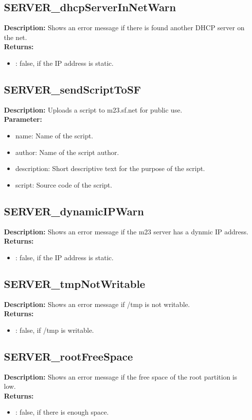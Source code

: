 \subsection{SERVER\_dhcpServerInNetWarn}
\textbf{Description:} Shows an error message if there is found another DHCP server on the net.\\
\textbf{Returns:}
\begin{itemize}
\item : false, if the IP address is static.
\end{itemize}

\subsection{SERVER\_sendScriptToSF}
\textbf{Description:} Uploads a script to m23.sf.net for public use.\\
\textbf{Parameter:}
\begin{itemize}
\item name: Name of the script.
\item author: Name of the script author.
\item description: Short descriptive text for the purpose of the script.
\item script: Source code of the script.
\end{itemize}

\subsection{SERVER\_dynamicIPWarn}
\textbf{Description:} Shows an error message if the m23 server has a dynmic IP address.\\
\textbf{Returns:}
\begin{itemize}
\item : false, if the IP address is static.
\end{itemize}

\subsection{SERVER\_tmpNotWritable}
\textbf{Description:} Shows an error message if /tmp is not writable.\\
\textbf{Returns:}
\begin{itemize}
\item : false, if /tmp is writable.
\end{itemize}

\subsection{SERVER\_rootFreeSpace}
\textbf{Description:} Shows an error message if the free space of the root partition is low.\\
\textbf{Returns:}
\begin{itemize}
\item : false, if there is enough space.
\end{itemize}

